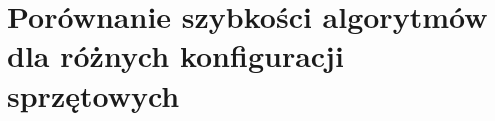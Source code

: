 \documentclass[document.tex]{subfiles}
\begin{document}




\section{Porównanie szybkości algorytmów dla różnych konfiguracji sprzętowych}
\end{document}
